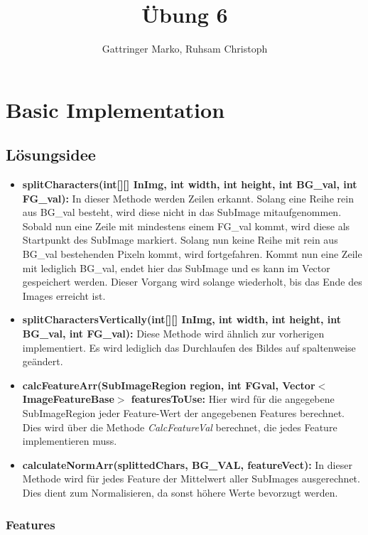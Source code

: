 \documentclass[11pt, a4paper, twoside]{article}   	%
\title{Übung 6}
\author{Gattringer Marko, Ruhsam Christoph}
\begin{document}
\setlength{\headheight}{15mm}



\section{Basic Implementation}
\subsection{Lösungsidee}
\begin{itemize}
	

\item \textbf{splitCharacters(int[][] InImg, int width, int height, int BG\_val, int FG\_val): }
In dieser Methode werden Zeilen erkannt. Solang eine Reihe rein aus BG\_val besteht, wird diese nicht in das SubImage mitaufgenommen. Sobald nun eine Zeile mit mindestens einem FG\_val kommt, wird diese als Startpunkt des SubImage markiert. Solang nun keine Reihe mit rein aus BG\_val bestehenden Pixeln kommt, wird fortgefahren.
Kommt nun eine Zeile mit lediglich BG\_val, endet hier das SubImage und es kann im Vector gespeichert werden. Dieser Vorgang wird solange wiederholt, bis das Ende des Images erreicht ist.

\item \textbf{splitCharactersVertically(int[][] InImg, int width, int height, int BG\_val, int FG\_val): }
Diese Methode wird ähnlich zur vorherigen implementiert. Es wird lediglich das Durchlaufen des Bildes auf spaltenweise geändert.

\item \textbf{calcFeatureArr(SubImageRegion region, int FGval, Vector$<$ImageFeatureBase$>$ featuresToUse: }
Hier wird für die angegebene SubImageRegion jeder Feature-Wert der angegebenen Features berechnet. Dies wird über die Methode \textit{CalcFeatureVal} berechnet, die jedes Feature implementieren muss.

\item \textbf{calculateNormArr(splittedChars, BG\_VAL, featureVect): }
In dieser Methode wird für jedes Feature der Mittelwert aller SubImages ausgerechnet. Dies dient zum Normalisieren, da sonst höhere Werte bevorzugt werden.
\end{itemize}
\subsubsection{Features}
\end{document}
